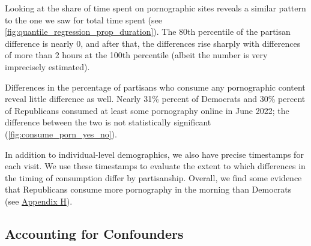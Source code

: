 \documentclass[12pt,twoside]{article}
\begin{document}
Looking at the share of time spent on pornographic sites reveals a similar pattern to the one we saw for total time spent (see \cref{fig:quantile_regression_prop_duration}). The 80th percentile of the partisan difference is nearly 0, and after that, the differences rise sharply with differences of more than 2 hours at the 100th percentile (albeit the number is very imprecisely estimated).

Differences in the percentage of partisans who consume any pornographic content reveal little difference as well. Nearly 31\% percent of Democrats and 30\% percent of Republicans consumed at least some pornography online in June 2022; the difference between the two is not statistically significant (\cref{fig:consume_porn_yes_no}).

In addition to individual-level demographics, we also have precise timestamps for each visit. We use these timestamps to evaluate the extent to which differences in the timing of consumption differ by partisanship. Overall, we find some evidence that Republicans consume more pornography in the morning than Democrats (see \hyperref[sm:smH]{Appendix H}).

\subsection{Accounting for Confounders}
\end{document}
